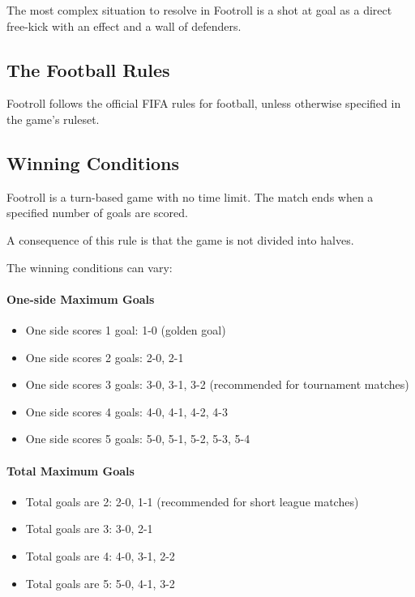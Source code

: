 \documentclass[12pt]{article}
\begin{document}
\begin{note}
The most complex situation to resolve in Footroll is a shot at goal as a direct free-kick with an effect and a wall of defenders.
\end{note}

\subsection{\textbf{The Football Rules}}

Footroll follows the official FIFA rules for football, unless otherwise specified in the game's ruleset.

\subsection{\textbf{Winning Conditions}}

Footroll is a turn-based game with no time limit. The match ends when a specified number of goals are scored.

\begin{note}
A consequence of this rule is that the game is not divided into halves.
\end{note}

The winning conditions can vary:

\paragraph{One-side Maximum Goals}

\begin{itemize}
\item One side scores 1 goal: 1-0 (golden goal)
\item One side scores 2 goals: 2-0, 2-1
\item One side scores 3 goals: 3-0, 3-1, 3-2 (recommended for tournament matches)
\item One side scores 4 goals: 4-0, 4-1, 4-2, 4-3
\item One side scores 5 goals: 5-0, 5-1, 5-2, 5-3, 5-4
\end{itemize}

\paragraph{Total Maximum Goals}

\begin{itemize}
\item Total goals are 2: 2-0, 1-1 (recommended for short league matches)
\item Total goals are 3: 3-0, 2-1
\item Total goals are 4: 4-0, 3-1, 2-2
\item Total goals are 5: 5-0, 4-1, 3-2
\end{itemize}
\end{document}
